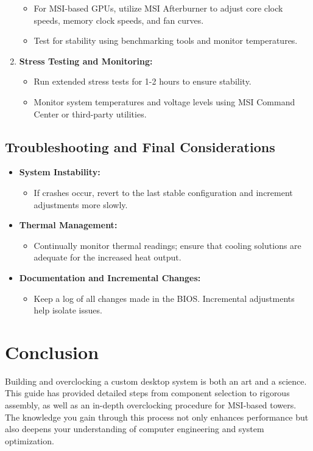 \documentclass{article}
\begin{document}
\begin{enumerate}[itemsep=5pt]
    \begin{itemize}[label=--]
        \item For MSI-based GPUs, utilize MSI Afterburner to adjust core clock speeds, memory clock speeds, and fan curves.
        \item Test for stability using benchmarking tools and monitor temperatures.
    \end{itemize}
    \item \textbf{Stress Testing and Monitoring:}
    \begin{itemize}[label=--]
        \item Run extended stress tests for 1-2 hours to ensure stability.
        \item Monitor system temperatures and voltage levels using MSI Command Center or third-party utilities.
    \end{itemize}
\end{enumerate}

\subsection{Troubleshooting and Final Considerations}
\begin{itemize}[itemsep=5pt]
    \item \textbf{System Instability:}
    \begin{itemize}[label=--]
        \item If crashes occur, revert to the last stable configuration and increment adjustments more slowly.
    \end{itemize}
    \item \textbf{Thermal Management:}
    \begin{itemize}[label=--]
        \item Continually monitor thermal readings; ensure that cooling solutions are adequate for the increased heat output.
    \end{itemize}
    \item \textbf{Documentation and Incremental Changes:}
    \begin{itemize}[label=--]
        \item Keep a log of all changes made in the BIOS. Incremental adjustments help isolate issues.
    \end{itemize}
\end{itemize}

\section{Conclusion}
Building and overclocking a custom desktop system is both an art and a science. This guide has provided detailed steps from component selection to rigorous assembly, as well as an in-depth overclocking procedure for MSI-based towers. The knowledge you gain through this process not only enhances performance but also deepens your understanding of computer engineering and system optimization.
\end{document}
